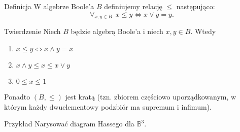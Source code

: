 \documentclass[a4paper,10pt]{beamer}
\begin{document}
\begin{frame}

	\begin{block}{Definicja}
		W algebrze Boole'a $B$ definiujemy relację $\leq$ następująco:
		$$\forall_{x,y\in B}\ \ x\leq y\iff x\vee y=y.$$
	\end{block}

	\begin{block}{Twierdzenie}
		Niech $B$ będzie algebrą Boole'a i niech $x,y\in B$. Wtedy
		\begin{enumerate}
			\item $x\leq y\iff x\wedge y =x$
			\item $x\wedge y\leq x\leq x\vee y$
			\item $0\leq x\leq 1$
		\end{enumerate}
		Ponadto $(B,\leq)$ jest kratą (tzn. zbiorem częściowo uporządkowanym, w którym każdy dwuelementowy podzbiór ma supremum i infimum).
	\end{block}

\end{frame}


\begin{frame}
	
	\begin{exampleblock}{Przykład}
		Narysować diagram Hassego dla $\mathbb{B}^3$.
		
		\begin{center}
			
		\end{center}
	\end{exampleblock}
	
\end{frame}
\end{document}
